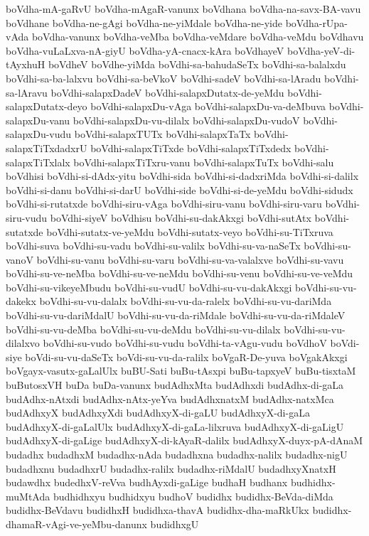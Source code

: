 {boVdha-mA-gaRvU
boVdha-mAgaR-vanunx
boVdhana
boVdha-na-savx-BA-vavu
boVdhane
boVdha-ne-gAgi
boVdha-ne-yiMdale
boVdha-ne-yide
boVdha-rUpa-vAda
boVdha-vanunx
boVdha-veMba
boVdha-veMdare
boVdha-veMdu
boVdhavu
boVdha-vuLaLxva-nA-giyU
boVdha-yA-cnacx-kAra
boVdhayeV
boVdha-yeV-di-tAyxhuH
boVdheV
boVdhe-yiMda
boVdhi-sa-bahudaSeTx
boVdhi-sa-balalxdu
boVdhi-sa-ba-lalxvu
boVdhi-sa-beVkoV
boVdhi-sadeV
boVdhi-sa-lAradu
boVdhi-sa-lAravu
boVdhi-salapxDadeV
boVdhi-salapxDutatx-de-yeMdu
boVdhi-salapxDutatx-deyo
boVdhi-salapxDu-vAga
boVdhi-salapxDu-va-deMbuva
boVdhi-salapxDu-vanu
boVdhi-salapxDu-vu-dilalx
boVdhi-salapxDu-vudoV
boVdhi-salapxDu-vudu
boVdhi-salapxTUTx
boVdhi-salapxTaTx
boVdhi-salapxTiTxdadxrU
boVdhi-salapxTiTxde
boVdhi-salapxTiTxdedx
boVdhi-salapxTiTxlalx
boVdhi-salapxTiTxru-vanu
boVdhi-salapxTuTx
boVdhi-salu
boVdhisi
boVdhi-si-dAdx-yitu
boVdhi-sida
boVdhi-si-dadxriMda
boVdhi-si-dalilx
boVdhi-si-danu
boVdhi-si-darU
boVdhi-side
boVdhi-si-de-yeMdu
boVdhi-sidudx
boVdhi-si-rutatxde
boVdhi-siru-vAga
boVdhi-siru-vanu
boVdhi-siru-varu
boVdhi-siru-vudu
boVdhi-siyeV
boVdhisu
boVdhi-su-dakAkxgi
boVdhi-sutAtx
boVdhi-sutatxde
boVdhi-sutatx-ve-yeMdu
boVdhi-sutatx-veyo
boVdhi-su-TiTxruva
boVdhi-suva
boVdhi-su-vadu
boVdhi-su-valilx
boVdhi-su-va-naSeTx
boVdhi-su-vanoV
boVdhi-su-vanu
boVdhi-su-varu
boVdhi-su-va-valalxve
boVdhi-su-vavu
boVdhi-su-ve-neMba
boVdhi-su-ve-neMdu
boVdhi-su-venu
boVdhi-su-ve-veMdu
boVdhi-su-vikeyeMbudu
boVdhi-su-vudU
boVdhi-su-vu-dakAkxgi
boVdhi-su-vu-dakekx
boVdhi-su-vu-dalalx
boVdhi-su-vu-da-ralelx
boVdhi-su-vu-dariMda
boVdhi-su-vu-dariMdalU
boVdhi-su-vu-da-riMdale
boVdhi-su-vu-da-riMdaleV
boVdhi-su-vu-deMba
boVdhi-su-vu-deMdu
boVdhi-su-vu-dilalx
boVdhi-su-vu-dilalxvo
boVdhi-su-vudo
boVdhi-su-vudu
boVdhi-ta-vAgu-vudu
boVdhoV
boVdi-siye
boVdi-su-vu-daSeTx
boVdi-su-vu-da-ralilx
boVgaR-De-yuva
boVgakAkxgi
boVgayx-vasutx-gaLalUlx
buBU-Sati
buBu-tAsxpi
buBu-tapxyeV
buBu-tisxtaM
buButosxVH
buDa
buDa-vanunx
budAdhxMta
budAdhxdi
budAdhx-di-gaLa
budAdhx-nAtxdi
budAdhx-nAtx-yeYva
budAdhxnatxM
budAdhx-natxMca
budAdhxyX
budAdhxyXdi
budAdhxyX-di-gaLU
budAdhxyX-di-gaLa
budAdhxyX-di-gaLalUlx
budAdhxyX-di-gaLa-lilxruva
budAdhxyX-di-gaLigU
budAdhxyX-di-gaLige
budAdhxyX-di-kAyaR-dalilx
budAdhxyX-duyx-pA-dAnaM
budadhx
budadhxM
budadhx-nAda
budadhxna
budadhx-nalilx
budadhx-nigU
budadhxnu
budadhxrU
budadhx-ralilx
budadhx-riMdalU
budadhxyXnatxH
budawdhx
budedhxV-reVva
budhAyxdi-gaLige
budhaH
budhanx
budhidhx-muMtAda
budhidhxyu
budhidxyu
budhoV
budidhx
budidhx-BeVda-diMda
budidhx-BeVdavu
budidhxH
budidhxa-thavA
budidhx-dha-maRkUkx
budidhx-dhamaR-vAgi-ve-yeMbu-danunx
budidhxgU
}
